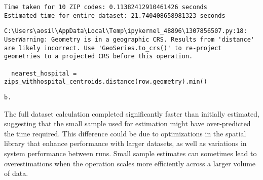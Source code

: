\documentclass[
  letterpaper,
  DIV=11,
  numbers=noendperiod]{scrartcl}
\begin{document}
\begin{verbatim}
Time taken for 10 ZIP codes: 0.11382412910461426 seconds
Estimated time for entire dataset: 21.740408658981323 seconds
\end{verbatim}

\begin{verbatim}
C:\Users\aosil\AppData\Local\Temp\ipykernel_48896\1307856507.py:18: UserWarning: Geometry is in a geographic CRS. Results from 'distance' are likely incorrect. Use 'GeoSeries.to_crs()' to re-project geometries to a projected CRS before this operation.

  nearest_hospital = zips_withhospital_centroids.distance(row.geometry).min()
\end{verbatim}

\begin{verbatim}
b.
\end{verbatim}

The full dataset calculation completed significantly faster than
initially estimated, suggesting that the small sample used for
estimation might have over-predicted the time required. This difference
could be due to optimizations in the spatial library that enhance
performance with larger datasets, as well as variations in system
performance between runs. Small sample estimates can sometimes lead to
overestimations when the operation scales more efficiently across a
larger volume of data.
\end{document}
